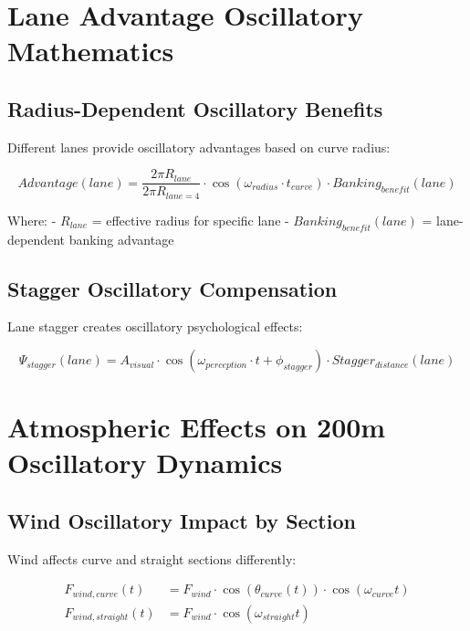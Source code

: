 \documentclass[12pt]{article}
\begin{document}
\section{Lane Advantage Oscillatory Mathematics}

\subsection{Radius-Dependent Oscillatory Benefits}

Different lanes provide oscillatory advantages based on curve radius:

\begin{equation}
Advantage(lane) = \frac{2\pi R_{lane}}{2\pi R_{lane=4}} \cdot \cos(\omega_{radius} \cdot t_{curve}) \cdot Banking_{benefit}(lane)
\end{equation}

Where:
- $R_{lane}$ = effective radius for specific lane
- $Banking_{benefit}(lane)$ = lane-dependent banking advantage

\subsection{Stagger Oscillatory Compensation}

Lane stagger creates oscillatory psychological effects:

\begin{equation}
\Psi_{stagger}(lane) = A_{visual} \cdot \cos(\omega_{perception} \cdot t + \phi_{stagger}) \cdot Stagger_{distance}(lane)
\end{equation}

\section{Atmospheric Effects on 200m Oscillatory Dynamics}

\subsection{Wind Oscillatory Impact by Section}

Wind affects curve and straight sections differently:

\begin{align}
F_{wind,curve}(t) &= F_{wind} \cdot \cos(\theta_{curve}(t)) \cdot \cos(\omega_{curve}t) \\
F_{wind,straight}(t) &= F_{wind} \cdot \cos(\omega_{straight}t)
\end{align}
\end{document}
